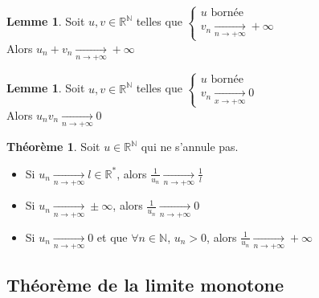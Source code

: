 \documentclass[10pt,a4paper]{article}
\theoremstyle{definition}
\newtheorem{theorem}[proposition]{Théorème}
\newtheorem{lemme}[proposition]{Lemme}
\begin{document}
\begin{lemme}
Soit $u, v \in \mathbb{R}^\mathbb{N}$ telles que $\begin{cases}
u \text{ bornée} \\ v_n \xrightarrow[n \to +\infty]{} +\infty \end{cases}$ \\
Alors $u_n + v_n \xrightarrow[n \to +\infty]{} +\infty$
\end{lemme}
\begin{lemme}
Soit $u, v \in \mathbb{R}^\mathbb{N}$ telles que $\begin{cases}
u \text{ bornée} \\ v_n \xrightarrow[x \to +\infty]{} 0 \end{cases}$ \\
Alors $u_n v_n \xrightarrow[n \to +\infty]{} 0$
\end{lemme}
\begin{theorem}
Soit $u \in \mathbb{R}^\mathbb{N}$ qui ne s'annule pas.
\begin{itemize}
\item Si $u_n \xrightarrow[n \to +\infty]{} l \in \mathbb{R}^*$, alors $\frac{1}{u_n} \xrightarrow[n \to +\infty]{} \frac{1}{l}$
\item Si $u_n \xrightarrow[n \to +\infty]{} \pm\infty$, alors $\frac{1}{u_n} \xrightarrow[n \to +\infty]{} 0$
\item Si $u_n \xrightarrow[n \to +\infty]{} 0$ et que $\forall n \in \mathbb{N}$, $u_n > 0$, alors $\frac{1}{u_n} \xrightarrow[n \to +\infty]{} +\infty$
\end{itemize}
\end{theorem}

\subsection{Théorème de la limite monotone}
\end{document}
